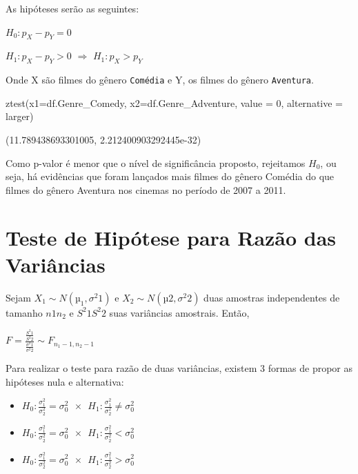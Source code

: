 \documentclass[
  letterpaper,
  DIV=11,
  numbers=noendperiod]{scrreprt}
\newenvironment{Shaded}{\begin{snugshade}}{\end{snugshade}}
\newcommand{\DecValTok}[1]{\textcolor[rgb]{0.68,0.00,0.00}{#1}}
\newcommand{\NormalTok}[1]{\textcolor[rgb]{0.00,0.23,0.31}{#1}}
\newcommand{\OperatorTok}[1]{\textcolor[rgb]{0.37,0.37,0.37}{#1}}
\newcommand{\StringTok}[1]{\textcolor[rgb]{0.13,0.47,0.30}{#1}}
\begin{document}
As hipóteses serão as seguintes:

\(H_{0} : p_{X} - p_{Y} = 0\)

\(H_{1} : p_{X} - p_{Y} > 0\) \(\Rightarrow\) \(H_{1} : p_{X} > p_{Y}\)

Onde X são filmes do gênero \texttt{Comédia} e Y, os filmes do gênero
\texttt{Aventura}.

\begin{Shaded}
\begin{Highlighting}[]
\NormalTok{ztest(x1}\OperatorTok{=}\NormalTok{df.Genre\_Comedy, x2}\OperatorTok{=}\NormalTok{df.Genre\_Adventure, value }\OperatorTok{=} \DecValTok{0}\NormalTok{, alternative }\OperatorTok{=} \StringTok{\textquotesingle{}larger\textquotesingle{}}\NormalTok{)}
\end{Highlighting}
\end{Shaded}

\begin{tcolorbox}[enhanced jigsaw, breakable, leftrule=.75mm, left=2mm, opacityback=0, bottomrule=.15mm, toprule=.15mm, rightrule=.15mm, arc=.35mm, colback=white]

(11.789438693301005, 2.212400903292445e-32)

\end{tcolorbox}

Como p-valor é menor que o nível de significância proposto, rejeitamos
\(H_0\), ou seja, há evidências que foram lançados mais filmes do gênero
Comédia do que filmes do gênero Aventura nos cinemas no período de 2007
a 2011.

\hypertarget{teste-de-hipuxf3tese-para-razuxe3o-das-variuxe2ncias}{%
\section{Teste de Hipótese para Razão das
Variâncias}\label{teste-de-hipuxf3tese-para-razuxe3o-das-variuxe2ncias}}

Sejam \({X_1 \sim N(µ_{1}, σ^2{1})}\) e \({X_2 \sim N(µ{2}, σ^2{2})}\)
duas amostras independentes de tamanho \({n{1}}{n_{2}}\) e
\({S^2{1}}{S^2{2}}\) suas variâncias amostrais. Então,

\(F = \frac{\frac{S^{2}{1}}{S^{2}{2}}}{\frac{\sigma^{2}{1}}{\sigma ^{2}{2}}} \sim F_{n_{1} - 1, n_{2} - 1}\)

Para realizar o teste para razão de duas variâncias, existem 3 formas de
propor as hipóteses nula e alternativa:

\begin{itemize}
\item
  \(H_{0}: \frac{\sigma^{2}_{1}}{\sigma^{2}_{2}} = \sigma^{2}_{0} \ \ \times \ \ H_{1}: \frac{\sigma^{2}_{1}}{\sigma^{2}_{2}} \neq \sigma^{2}_{0}\)
\item
  \(H_{0}: \frac{\sigma^{2}_{1}}{\sigma^{2}_{2}} = \sigma^{2}_{0} \ \ \times \ \ H_{1}: \frac{\sigma^{2}_{1}}{\sigma^{2}_{2}} < \sigma^{2}_{0}\)
\item
  \(H_{0}: \frac{\sigma^{2}_{1}}{\sigma^{2}_{2}} = \sigma^{2}_{0} \ \ \times \ \ H_{1}: \frac{\sigma^{2}_{1}}{\sigma^{2}_{2}} > \sigma^{2}_{0}\)
\end{itemize}
\end{document}

